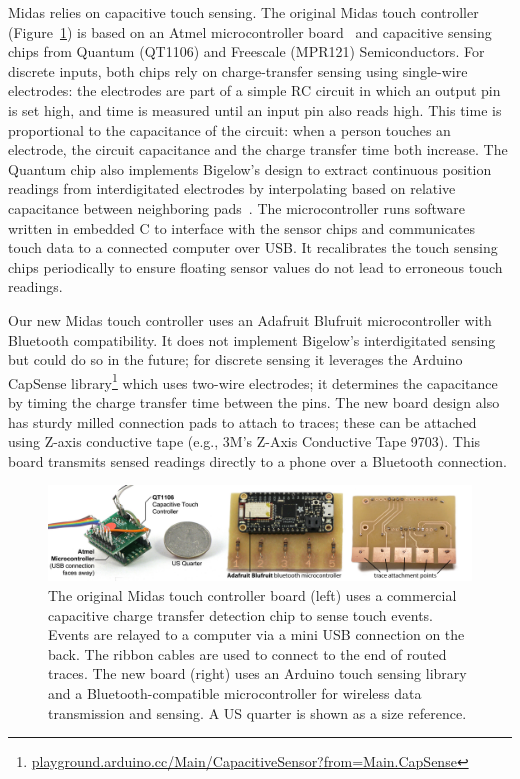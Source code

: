         Midas relies on capacitive touch sensing. The original Midas touch controller (Figure~\ref{fig:midas-microcontroller}) is based on an Atmel microcontroller board~\cite{teensy} and capacitive sensing chips from Quantum (QT1106) and Freescale (MPR121) Semiconductors. For discrete inputs, both chips rely on charge-transfer sensing using single-wire electrodes: the electrodes are part of a simple RC circuit in which an output pin is set high, and time is measured until an input pin also reads high. This time is proportional to the capacitance of the circuit: when a person touches an electrode, the circuit capacitance and the charge transfer time both increase. The Quantum chip also implements Bigelow's design to extract continuous position readings from interdigitated electrodes by interpolating based on relative capacitance between neighboring pads~\cite{bigelow-interdigitated}. The microcontroller runs software written in embedded C to interface with the sensor chips and communicates touch data to a connected computer over USB. It recalibrates the touch sensing chips periodically to ensure floating sensor values do not lead to erroneous touch readings.
        
        Our new Midas touch controller uses an Adafruit Blufruit microcontroller with Bluetooth compatibility. It does not implement Bigelow's interdigitated sensing but could do so in the future; for discrete sensing it leverages the Arduino CapSense library\footnote{\url{playground.arduino.cc/Main/CapacitiveSensor?from=Main.CapSense}} which uses two-wire electrodes; it determines the capacitance by timing the charge transfer time between the pins. The new board design also has sturdy milled connection pads to attach to traces; these can be attached using Z-axis conductive tape (e.g., 3M's Z-Axis Conductive Tape 9703). This board transmits sensed readings directly to a phone over a Bluetooth connection.
        
        \begin{figure}[b]
        \centering
\includegraphics[width=\textwidth]{figures/midas/microcontrollerz.jpg}
\caption{The original Midas touch controller board (left) uses a commercial capacitive charge transfer detection chip to sense touch events. Events are relayed to a computer via a mini USB connection on the back. The ribbon cables are used to connect to the end of routed traces. The new board (right) uses an Arduino touch sensing library and a Bluetooth-compatible microcontroller for wireless data transmission and sensing. A US quarter is shown as a size reference.} 
\label{fig:midas-microcontroller}
\end{figure}

